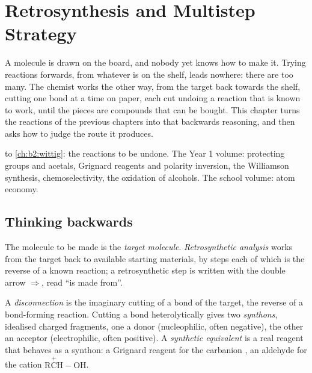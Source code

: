 \chapter{Retrosynthesis and Multistep Strategy}\label{ch:b2:retrosynthesis}

A molecule is drawn on the board, and nobody yet knows how to make it. Trying reactions forwards, from
whatever is on the shelf, leads nowhere: there are too many. The chemist works the other way, from the
target back towards the shelf, cutting one bond at a time on paper, each cut undoing a reaction that is
known to work, until the pieces are compounds that can be bought. This chapter turns the reactions of
the previous chapters into that backwards reasoning, and then asks how to judge the route it produces.

\begin{recall}
 to \cref{ch:b2:wittig}: the reactions to be undone. The Year 1 volume:
protecting groups and acetals, Grignard reagents and polarity inversion, the Williamson synthesis,
chemoselectivity, the oxidation of alcohols. The school volume: atom economy.
\end{recall}

\section{Thinking backwards}

\begin{definition}\label{def:b2:retrosynthesis:analysis}
The molecule to be made is the \emph{target molecule}. \emph{Retrosynthetic analysis}
 works from the target back to available starting materials,
by steps each of which is the reverse of a known reaction; a retrosynthetic step is written with the
double arrow $\Rightarrow$, read ``is made from''.
\end{definition}

\begin{definition}\label{def:b2:retrosynthesis:disconnection}
A \emph{disconnection} is the imaginary cutting of a bond of the target, the
reverse of a bond-forming reaction. Cutting a bond heterolytically gives two \emph{synthons},
idealised charged fragments, one a donor (nucleophilic, often negative), the other an acceptor
(electrophilic, often positive). A \emph{synthetic equivalent} is a real
reagent that behaves as a synthon: a Grignard reagent for the carbanion , an aldehyde for the
cation $\mathrm{R\overset{+}{C}H{-}OH}$.
\end{definition}

